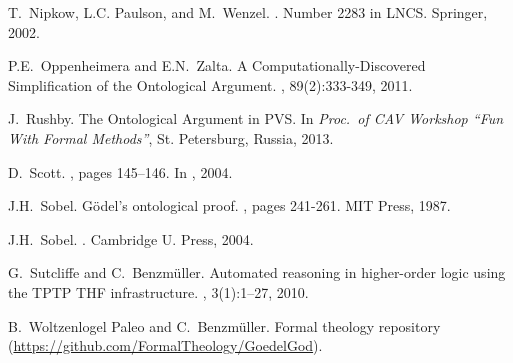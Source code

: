 \documentclass{llncs}
\begin{document}
\begin{thebibliography}{10}
T.~Nipkow, L.C. Paulson, and M.~Wenzel.
.
\newblock Number 2283 in LNCS. Springer, 2002.

P.E.~Oppenheimera and E.N.~Zalta.
\newblock A Computationally-Discovered Simplification of the Ontological Argument.
, 89(2):333-349, 2011.


J.~Rushby.
\newblock The Ontological Argument in PVS. 
\newblock In {\em Proc.~of CAV Workshop ``Fun With Formal Methods''}, St. Petersburg, Russia, 2013.

D.~Scott.
, pages 145--146.
\newblock In  \cite{sobel2004logic}, 2004.

J.H.~Sobel. 
\newblock G\"odel's ontological proof. 
, pages 241-261. MIT Press, 1987.

J.H.~Sobel.
.
\newblock Cambridge U. Press, 2004.

G.~Sutcliffe and C.~Benzm{\"u}ller.
\newblock Automated reasoning in higher-order logic using the {TPTP THF}
  infrastructure.
, 3(1):1--27, 2010.

B.~Woltzenlogel Paleo and C.~Benzm\"uller.
\newblock Formal theology repository
  (\url{https://github.com/FormalTheology/GoedelGod}).
\end{thebibliography}
\end{document}
